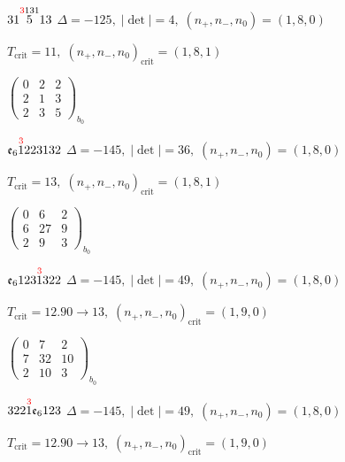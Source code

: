 \documentclass[10pt]{article}
\begin{document}
\smallskip

$31\overset{\textcolor{red}{3}131}{5}13$ \quad $\Delta=-125,\; |\det|=4,\; (n_+,n_-,n_0)=(1,8,0)$

\hspace{1em}$T_{\text{crit}}=11,\; (n_+,n_-,n_0)_{\text{crit}}=(1,8,1)$

\hspace{2em}$\left(\begin{smallmatrix}0 & 2 & 2 \\ 2 & 1 & 3 \\ 2 & 3 & 5\end{smallmatrix}\right)_{\!b_0}$

\smallskip

$\mathfrak{e}_6\overset{\textcolor{red}{3}}{1}223132$ \quad $\Delta=-145,\; |\det|=36,\; (n_+,n_-,n_0)=(1,8,0)$

\hspace{1em}$T_{\text{crit}}=13,\; (n_+,n_-,n_0)_{\text{crit}}=(1,8,1)$

\hspace{2em}$\left(\begin{smallmatrix}0 & 6 & 2 \\ 6 & 27 & 9 \\ 2 & 9 & 3\end{smallmatrix}\right)_{\!b_0}$

\smallskip

$\mathfrak{e}_6123\overset{\textcolor{red}{3}}{1}322$ \quad $\Delta=-145,\; |\det|=49,\; (n_+,n_-,n_0)=(1,8,0)$

\hspace{1em}$T_{\text{crit}}=12.90 \to 13,\; (n_+,n_-,n_0)_{\text{crit}}=(1,9,0)$

\hspace{2em}$\left(\begin{smallmatrix}0 & 7 & 2 \\ 7 & 32 & 10 \\ 2 & 10 & 3\end{smallmatrix}\right)_{\!b_0}$

\smallskip

$322\overset{\textcolor{red}{3}}{1}\mathfrak{e}_6123$ \quad $\Delta=-145,\; |\det|=49,\; (n_+,n_-,n_0)=(1,8,0)$

\hspace{1em}$T_{\text{crit}}=12.90 \to 13,\; (n_+,n_-,n_0)_{\text{crit}}=(1,9,0)$
\end{document}
